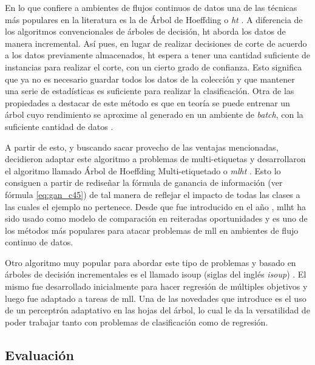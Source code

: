 En lo que confiere a ambientes de flujos continuos de datos una de las técnicas
más populares en la literatura es la de Árbol de Hoeffding o
\textit{\acrfull{ht}} \cite{domingos_mining_2002}. A diferencia de los
algoritmos convencionales de árboles de decisión, \acrlong{ht} aborda los datos
de manera incremental. Así pues, en lugar de realizar decisiones de corte de
acuerdo a los datos previamente almacenados, \acrshort{ht} espera a tener una
cantidad suficiente de instancias para realizar el corte, con un cierto grado de
confianza. Esto significa que ya no es necesario guardar todos los datos de la
colección y que mantener una serie de estadísticas es suficiente para realizar
la clasificación. Otra de las propiedades a destacar de este método es que en
teoría se puede entrenar un árbol cuyo rendimiento se aproxime al generado en un
ambiente de \textit{batch}, con la suficiente cantidad de datos
\cite{bifet_machine_2018}. 

A partir de esto, y buscando sacar provecho de las ventajas mencionadas,
\citeauthor{read_scalable_2012} decidieron adaptar este algoritmo a problemas de
multi-etiquetas y desarrollaron el algoritmo llamado Árbol de Hoeffding
Multi-etiquetado o \textit{\acrfull{mlht}} \cite{read_scalable_2012}. Esto lo
consiguen a partir de rediseñar la fórmula de ganancia de información (ver
fórmula \ref{eq:gan_c45}) de tal manera de reflejar el impacto de todas las
clases a las cuales el ejemplo no pertenece. Desde que fue introducido en el año
\citeyear{read_scalable_2012}, \acrshort{mlht} ha sido usado como modelo de
comparación en reiteradas oportunidades \cite{sousa_multi-label_2018} y es uno
de los métodos más populares para atacar problemas de \acrshort{mll} en
ambientes de flujo continuo de datos.

Otro algoritmo muy popular para abordar este tipo de problemas y basado en
árboles de decisión incrementales es el llamado \acrshort{isoup} (siglas del
inglés \textit{\acrlong{isoup}}) \cite{osojnik_multi-label_2017}. El mismo fue
desarrollado inicialmente para hacer regresión de múltiples objetivos y luego
fue adaptado a tareas de \acrshort{mll}. Una de las novedades que introduce es
el uso de un perceptrón adaptativo en las hojas del árbol, lo cual le da la
versatilidad de poder trabajar tanto con problemas de clasificación como de
regresión.


\subsection{Evaluación}
\label{mll_evaluacion}

